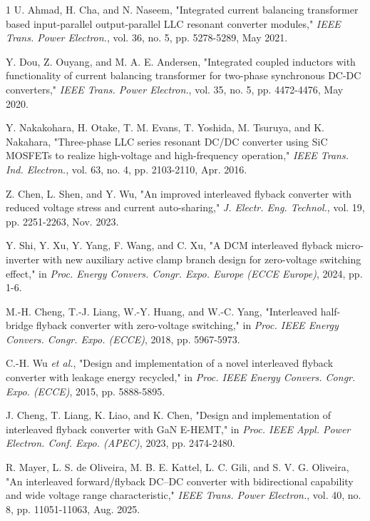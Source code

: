 \documentclass[lettersize,journal]{IEEEtran}
\begin{document}
\begin{thebibliography}{1}
U. Ahmad, H. Cha, and N. Naseem, "Integrated current balancing transformer based input-parallel output-parallel LLC resonant converter modules," \textit{IEEE Trans. Power Electron.}, vol. 36, no. 5, pp. 5278-5289, May 2021.

Y. Dou, Z. Ouyang, and M. A. E. Andersen, "Integrated coupled inductors with functionality of current balancing transformer for two-phase synchronous DC-DC converters," \textit{IEEE Trans. Power Electron.}, vol. 35, no. 5, pp. 4472-4476, May 2020.

Y. Nakakohara, H. Otake, T. M. Evans, T. Yoshida, M. Tsuruya, and K. Nakahara, "Three-phase LLC series resonant DC/DC converter using SiC MOSFETs to realize high-voltage and high-frequency operation," \textit{IEEE Trans. Ind. Electron.}, vol. 63, no. 4, pp. 2103-2110, Apr. 2016.

Z. Chen, L. Shen, and Y. Wu, "An improved interleaved flyback converter with reduced voltage stress and current auto-sharing," \textit{J. Electr. Eng. Technol.}, vol. 19, pp. 2251-2263, Nov. 2023.

Y. Shi, Y. Xu, Y. Yang, F. Wang, and C. Xu, "A DCM interleaved flyback micro-inverter with new auxiliary active clamp branch design for zero-voltage switching effect," in \textit{Proc. Energy Convers. Congr. Expo. Europe (ECCE Europe)}, 2024, pp. 1-6.

M.-H. Cheng, T.-J. Liang, W.-Y. Huang, and W.-C. Yang, "Interleaved half-bridge flyback converter with zero-voltage switching," in \textit{Proc. IEEE Energy Convers. Congr. Expo. (ECCE)}, 2018, pp. 5967-5973.

C.-H. Wu \textit{et al.}, "Design and implementation of a novel interleaved flyback converter with leakage energy recycled," in \textit{Proc. IEEE Energy Convers. Congr. Expo. (ECCE)}, 2015, pp. 5888-5895.

J. Cheng, T. Liang, K. Liao, and K. Chen, "Design and implementation of interleaved flyback converter with GaN E-HEMT," in \textit{Proc. IEEE Appl. Power Electron. Conf. Expo. (APEC)}, 2023, pp. 2474-2480.

R. Mayer, L. S. de Oliveira, M. B. E. Kattel, L. C. Gili, and S. V. G. Oliveira, "An interleaved forward/flyback DC–DC converter with bidirectional capability and wide voltage range characteristic," \textit{IEEE Trans. Power Electron.}, vol. 40, no. 8, pp. 11051-11063, Aug. 2025.


\end{thebibliography}
\end{document}
